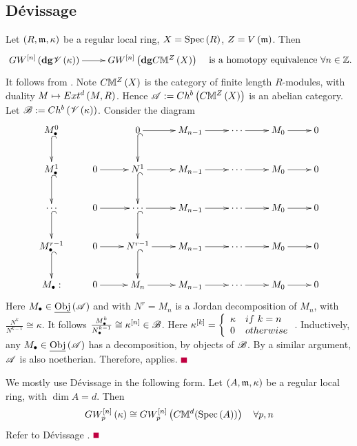 \documentclass[12pt]{article}
\begin{document}
\subsection{D\'{e}vissage}  
\bL\label{regLocal}{\rm 
Let $\LRf{R, \m, \kappa}$ be a regular local ring, $X=\spec{R}$, $Z=V\LRf{\m}$. Then 
$$
\diagram
{G}W^{\LRt{n}}\LRf{{\bf dg}{\SV}\LRf{\kappa}} \ar[r] & {G}W^{\LRt{n}}\LRf{{\bf dg}C{\BM}^Z\LRf{X}}\\
\enddiagram
\quad {\rm is~a~homotopy~equivalence~} \forall n\in {\BZ}.
$$
}
\eL
\pf It follows from \cite[Thm 5.3]{M25}. 
Note $C{\BM}^Z\LRf{X}$ is the category of finite length $R$-modules, with duality $M \mapsto {E}xt^d\LRf{M, R}$. 
Hence ${\SA}:=Ch^b\LRf{C{\BM}^Z\LRf{X}}$
 is an abelian category. Let ${\SB}:= Ch^b\LRf{{\SV}\LRf{\kappa}}$.
Consider the diagram
$$ 
\diagram 
M_{\bul}^0\ar@{^(->}[d] &&0\ar@{^(->}[d]\ar[r] & M_{n-1}\ar[r] & \cdots \ar[r] & M_0 \ar[r] & 0\\
M_{\bul}^1\ar@{^(->}[d] &0\ar[r]&N^{1}\ar@{^(->}[d] \ar[r] & M_{n-1}\ar[r] & \cdots \ar[r] & M_0 \ar[r] & 0\\
\cdots\ar@{^(->}[d]  &0\ar[r]&\cdots\ar@{^(->}[d]\ar[r] & M_{n-1}\ar[r] & \cdots \ar[r] & M_0 \ar[r] & 0\\
M_{\bul}^{r-1}\ar@{^(->}[d] &0\ar[r] &N^{r-1}\ar@{^(->}[d]\ar[r] & M_{n-1}\ar[r] & \cdots \ar[r] & M_0 \ar[r] & 0\\
M_{\bul}:  &0 \ar[r] & M_n \ar[r] & M_{n-1}\ar[r] & \cdots \ar[r] & M_0 \ar[r] & 0\\
\enddiagram 
$$
Here $M_{\bul}\in \Obj{{\SA}}$ and with $N^r=M_n$ is a Jordan decomposition of $M_n$, with $\frac{N^k}{N^{k-1}}\cong \kappa$. It follows $\frac{M^k_{\bul}}{N^{k-1}_{\bul}}\cong \kappa^{\LRt{n}}\in {\SB}$. Here 
$\kappa^{\LRt{k}}=\LBrace{{ll}\kappa & if ~k=n\\ 0 & otherwise\\}$.  
Inductively, any $M_{\bul}\in \Obj{{\SA}}$ has a decomposition, by objects of ${\SB}$. By a similar argument,
 ${\SA}$ is also noetherian. Therefore, \cite[Thm 5.3]{M25} applies. 
$\eop$ 

\vspace{3mm}
We mostly use D\'{e}vissage in the following form. 
\bL\label{finfpdLem}{\rm 
Let $\LRf{A, \m, \kappa}$ be a regular local ring, with $\dim A=d$. Then  
$$
GW_p^{\LRt{n}}\LRf{\kappa} \cong GW_p^{\LRt{n}}\LRf{C{\BM}^d(\spec{A})}\quad \forall p, n
$$
}
\eL
\pf Refer to D\'{e}vissage \cite[Thm 6.1]{M25}. $\eop$
\end{document}
